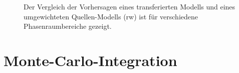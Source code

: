 \begin{figure}[h]
	\caption{Der Vergleich der Vorhersagen eines transferierten Modells und eines umgewichteten Quellen-Modells (rw) ist für verschiedene Phasenraumbereiche gezeigt.}
	\label{Vgl-transfer-rw}
\end{figure}
\section{Monte-Carlo-Integration}

